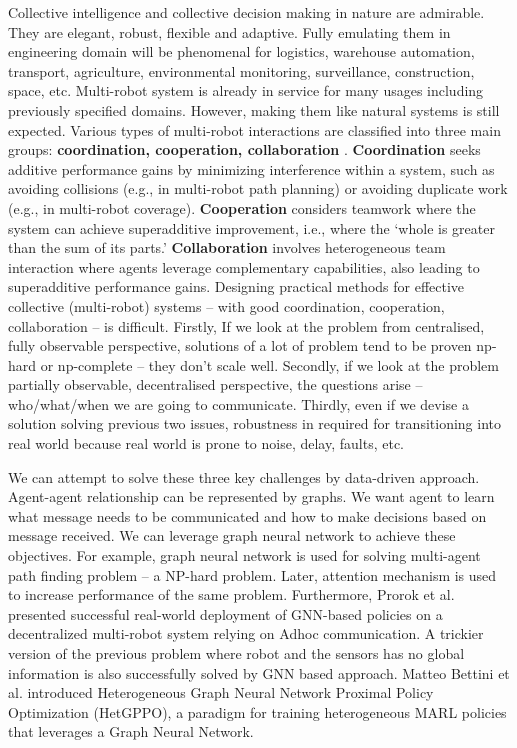 \documentclass[serif,professionalfont]{article}
\title{}
\author{}
\date{15 June 2023}
\begin{document}

Collective intelligence and collective decision making in nature are admirable. They are elegant, robust, flexible and adaptive. Fully emulating them in engineering domain will be phenomenal for logistics, warehouse automation, transport, agriculture, environmental monitoring, surveillance, construction, space, etc. Multi-robot system is already in service for many usages including previously specified domains. However, making them like natural systems is still expected. Various types of multi-robot interactions are classified into three main groups: \textbf{coordination, cooperation, collaboration} \cite{prorok2021beyondRobustness}. \textbf{Coordination} seeks additive performance gains by minimizing interference within a system, such as avoiding collisions (e.g., in multi-robot path planning) or avoiding duplicate work (e.g., in multi-robot coverage). \textbf{Cooperation} considers teamwork where the system can achieve superadditive improvement, i.e., where the ‘whole is greater than the sum of its parts.’ \textbf{Collaboration} involves heterogeneous team interaction where agents leverage complementary capabilities, also leading to superadditive performance gains. Designing practical methods for effective collective (multi-robot) systems -- with good coordination, cooperation, collaboration -- is difficult. Firstly, If we look at the problem from centralised, fully observable perspective, solutions of a lot of problem tend to be proven np-hard or np-complete -- they don't scale well. Secondly, if we look at the problem partially observable, decentralised perspective, the questions arise -- who/what/when we are going to communicate. Thirdly, even if we devise a solution solving previous two issues, robustness in required for transitioning into real world because real world is prone to noise, delay, faults, etc.

We can attempt to solve these three key challenges by data-driven approach. Agent-agent relationship can be represented by graphs. We want agent to learn what message needs to be communicated and how to make decisions based on message received. We can leverage graph neural network to achieve these objectives. For example, graph neural network is used for solving multi-agent path finding problem\cite{decentralizedMultiRobotPathPlanning} -- a NP-hard problem. Later, attention mechanism is used to increase performance of the same problem\cite{messageAwareGraphAttentionMultiRobotPath}. Furthermore, Prorok et al.\cite{aFrameworkForRealWorldMultiRobotSystemsRunningDecentralizedGNNBasedPolicies} presented successful real-world deployment of GNN-based policies on a decentralized multi-robot system relying on Adhoc communication. A trickier version of the previous problem where robot and the sensors has no global information is also successfully solved by GNN based approach\cite{lLearningToNavigateUsingVisualSensorNetworks}. Matteo Bettini et al. introduced Heterogeneous Graph Neural Network Proximal Policy Optimization (HetGPPO), a paradigm for training heterogeneous MARL policies that leverages a Graph Neural Network\cite{HeterogeneousMultiRobotReinforcementLearning}.
\end{document}
